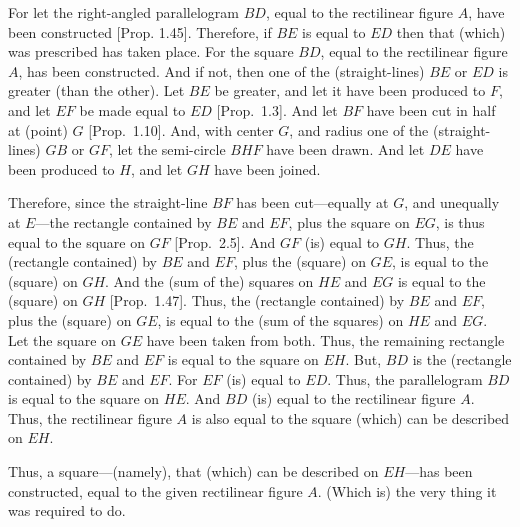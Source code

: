 For let the right-angled parallelogram $BD$,  equal to
the rectilinear figure $A$, have been constructed  [Prop. 1.45]. Therefore, if $BE$ is equal to $ED$ then
that (which) was prescribed has taken place. For the square $BD$, equal to the rectilinear figure $A$,
has been constructed. And if not, then
one of the (straight-lines) $BE$ or $ED$ is greater (than the other). Let $BE$ be greater, and let it have been
produced to $F$, and let $EF$ be made equal to $ED$ [Prop.~1.3].
And let $BF$ have been cut in half at (point) $G$ [Prop.~1.10]. And, with center $G$, and
radius one of the (straight-lines) $GB$ or $GF$, let the semi-circle $BHF$ have been drawn.
And let $DE$ have been produced to $H$, and let $GH$ have been joined.

Therefore, since the straight-line $BF$ has been cut---equally at $G$,
and unequally at $E$---the rectangle contained by $BE$ and $EF$, plus the
square on $EG$, is thus equal to the square on $GF$ [Prop.~2.5]. And $GF$ (is)
equal to $GH$. Thus, the (rectangle contained) by $BE$ and $EF$, plus the
(square) on $GE$, is equal to the (square) on $GH$. And the (sum of the) squares on $HE$ and $EG$  is equal to the (square)
on $GH$  [Prop.~1.47].
Thus, the (rectangle contained) by $BE$ and $EF$, plus the (square) on $GE$, is
equal to the (sum of the squares) on $HE$ and $EG$.
Let the square on $GE$ have been taken from both. Thus, the remaining
rectangle contained by $BE$ and $EF$ is equal to the square
on $EH$. But, $BD$ is the (rectangle contained) by $BE$ and $EF$. For $EF$ (is)
equal to $ED$. Thus, the parallelogram $BD$ is equal to the square on $HE$.
And $BD$ (is) equal to the rectilinear figure $A$. Thus, the rectilinear figure
$A$ is also equal to the square (which) can be described on $EH$.

Thus, a 
square---(namely), that (which) can be described on $EH$---has been constructed, equal
to the given rectilinear figure $A$. (Which is) the very thing it was required to do.
\newpage
\thispagestyle{plain}
~\\